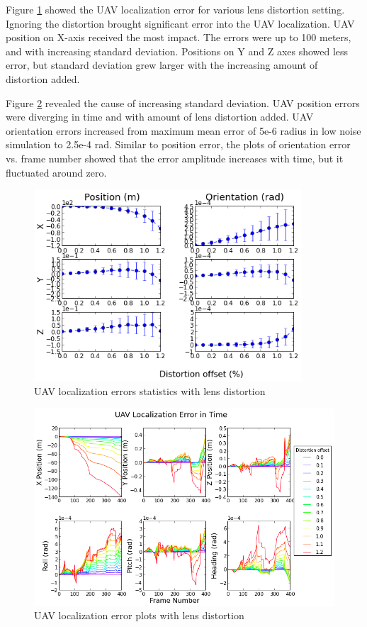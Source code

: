 Figure \ref{fig:simfig47} showed the UAV localization error for
various lens distortion setting. Ignoring the distortion brought
significant error into the UAV localization. UAV position on X-axis
received the most impact. The errors were up to 100 meters, and with
increasing standard deviation. Positions on Y and Z axes showed less
error, but standard deviation grew  larger with the increasing amount of
distortion added. 

Figure \ref{fig:simfig48} revealed the cause of increasing standard
deviation. UAV position errors were diverging in time and with amount
of lens distortion added. UAV orientation errors increased from
maximum mean error of 5e-6 radius in low noise simulation to 2.5e-4
rad. Similar to position error, the plots of orientation error vs.
frame number showed that the error amplitude increases with time,
but it fluctuated around zero.

\begin{figure}[h]
  \centering
  \includegraphics[width=10cm,keepaspectratio=true]{./Figures/SimulationFigures/Figure47.png}
  \caption{UAV localization errors statistics with lens distortion}
  \label{fig:simfig47}
\end{figure}

\begin{figure}[h]
  \centering
  \includegraphics[width=14cm,keepaspectratio=true]{./Figures/SimulationFigures/Figure48.png}
  \caption{UAV localization error plots with lens distortion}
  \label{fig:simfig48}
\end{figure}

